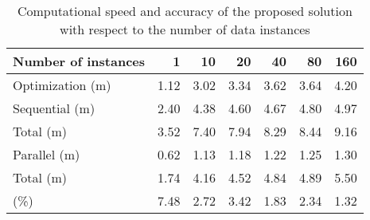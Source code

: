 \begin{table*}
  \centering
  \caption{
    Computational speed and accuracy of the proposed solution with respect to
    the number of data instances
  }
  \ttfamily
  \begin{tabular}{lrrrrrr}
    \toprule
    \textnormal{Number of instances} &    1 &   10 &   20 &   40 &   80 &  160 \\
    \midrule
    \textnormal{Optimization (m)}    & 1.12 & 3.02 & 3.34 & 3.62 & 3.64 & 4.20 \\
    \midrule
    \textnormal{Sequential (m)}      & 2.40 & 4.38 & 4.60 & 4.67 & 4.80 & 4.97 \\
    \textnormal{Total (m)}           & 3.52 & 7.40 & 7.94 & 8.29 & 8.44 & 9.16 \\
    \midrule
    \textnormal{Parallel (m)}        & 0.62 & 1.13 & 1.18 & 1.22 & 1.25 & 1.30 \\
    \textnormal{Total (m)}           & 1.74 & 4.16 & 4.52 & 4.84 & 4.89 & 5.50 \\
    \midrule
    \textnormal{\up{NRMSE} (\%)}     & 7.48 & 2.72 & 3.42 & 1.83 & 2.34 & 1.32 \\
    \bottomrule
  \end{tabular}
\end{table*}
